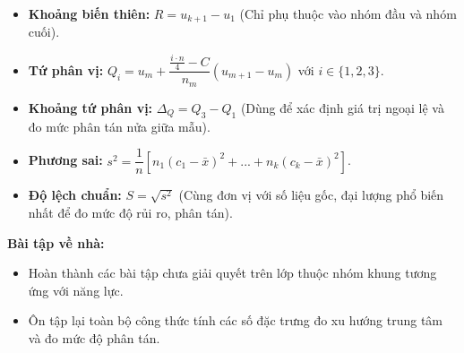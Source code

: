 \documentclass[12pt]{article}
\begin{document}
	\begin{tcolorbox}[colback=yellow!10!white, colframe=orange!60!black,
		fonttitle=\bfseries, title={Công thức và định lý cần nhớ}]
		\begin{itemize}
			\item \textbf{Khoảng biến thiên:} $R = u_{k+1} - u_1$ (Chỉ phụ thuộc vào nhóm đầu và nhóm cuối).
			\item \textbf{Tứ phân vị:} $Q_i = u_m + \dfrac{\frac{i \cdot n}{4} - C}{n_m} (u_{m+1} - u_m)$ với $i \in \{1,2,3\}$.
			\item \textbf{Khoảng tứ phân vị:} $\Delta_Q = Q_3 - Q_1$ (Dùng để xác định giá trị ngoại lệ và đo mức phân tán nửa giữa mẫu).
			\item \textbf{Phương sai:} $s^2 = \dfrac{1}{n} \left[ n_1(c_1 - \bar{x})^2 + ... + n_k(c_k - \bar{x})^2 \right]$.
			\item \textbf{Độ lệch chuẩn:} $S = \sqrt{s^2}$ (Cùng đơn vị với số liệu gốc, đại lượng phổ biến nhất để đo mức độ rủi ro, phân tán).
		\end{itemize}
	\end{tcolorbox}
	
	\vspace{3mm}
	\textbf{Bài tập về nhà:} 
	\begin{itemize}
		\item Hoàn thành các bài tập chưa giải quyết trên lớp thuộc nhóm khung tương ứng với năng lực.
		\item Ôn tập lại toàn bộ công thức tính các số đặc trưng đo xu hướng trung tâm và đo mức độ phân tán.
	\end{itemize}
	
\end{document}
